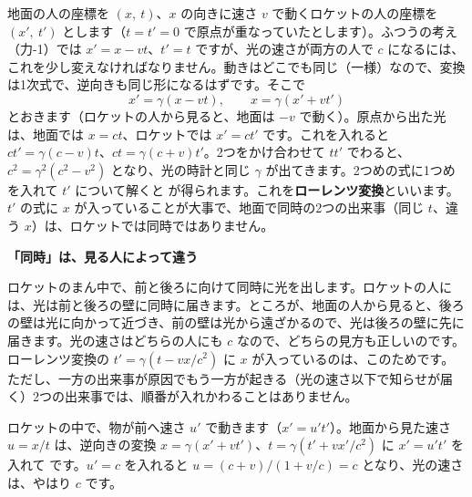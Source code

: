 地面の人の座標を $(x,\ t)$、$x$ の向きに速さ $v$ で動くロケットの人の座標を $(x',\ t')$ とします（$t=t'=0$ で原点が重なっていたとします）。ふつうの考え（力-1）では $x'=x-vt$、$t'=t$ ですが、光の速さが両方の人で $c$ になるには、これを少し変えなければなりません。動きはどこでも同じ（一様）なので、変換は1次式で、逆向きも同じ形になるはずです。そこで
\[ x'=\gamma(x-vt),\qquad x=\gamma(x'+vt') \]
とおきます（ロケットの人から見ると、地面は $-v$ で動く）。原点から出た光は、地面では $x=ct$、ロケットでは $x'=ct'$ です。これを入れると $ct'=\gamma(c-v)t$、$ct=\gamma(c+v)t'$。2つをかけ合わせて $tt'$ でわると、$c^2=\gamma^2(c^2-v^2)$ となり、光の時計と同じ $\gamma$ が出てきます。2つめの式に1つめを入れて $t'$ について解くと
\label{ph:原-11:lorentz}が得られます。これを\textbf{ローレンツ変換}といいます。$t'$ の式に $x$ が入っていることが大事で、地面で同時の2つの出来事（同じ $t$、違う $x$）は、ロケットでは同時ではありません。

\begin{motto}[4]
\textbf{「同時」は、見る人によって違う}\par
ロケットのまん中で、前と後ろに向けて同時に光を出します。ロケットの人には、光は前と後ろの壁に同時に届きます。ところが、地面の人から見ると、後ろの壁は光に向かって近づき、前の壁は光から遠ざかるので、光は後ろの壁に先に届きます。光の速さはどちらの人にも $c$ なので、どちらの見方も正しいのです。ローレンツ変換の $t'=\gamma(t-vx/c^2)$ に $x$ が入っているのは、このためです。ただし、一方の出来事が原因でもう一方が起きる（光の速さ以下で知らせが届く）2つの出来事では、順番が入れかわることはありません。
\end{motto}

ロケットの中で、物が前へ速さ $u'$ で動きます（$x'=u't'$）。地面から見た速さ $u=x/t$ は、逆向きの変換 $x=\gamma(x'+vt')$、$t=\gamma(t'+vx'/c^2)$ に $x'=u't'$ を入れて
\label{ph:原-11:gousei}です。$u'=c$ を入れると $u=(c+v)/(1+v/c)=c$ となり、光の速さは、やはり $c$ です。

\begin{phflow}
\end{phflow}

